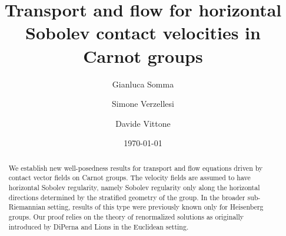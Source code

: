 \documentclass[11pt]{amsart}
\title[Transport and flow for horizontal Sobolev contact velocities in Carnot groups]{Transport and flow for horizontal Sobolev contact velocities in Carnot groups}
\author[G.~Somma]{Gianluca Somma}
\author[S.~Verzellesi]{Simone Verzellesi}
\author[D.~Vittone]{Davide Vittone}
\date{\today}
\theoremstyle{plain}
\theoremstyle{definition}
\theoremstyle{remark}
\numberwithin{equation}{section}
\begin{document}
\begin{abstract}
We establish new well-posedness results for transport and flow equations driven by contact vector fields on Carnot groups. The velocity fields are assumed to have horizontal Sobolev regularity, namely Sobolev regularity only along the horizontal directions determined by the stratified geometry of the group. In the broader sub-Riemannian setting, results of this type were previously known only for Heisenberg groups. Our proof relies on the theory of renormalized solutions as originally introduced by DiPerna and Lions in the Euclidean setting.
%
%
%
%
\end{abstract}
\maketitle
\end{document}
